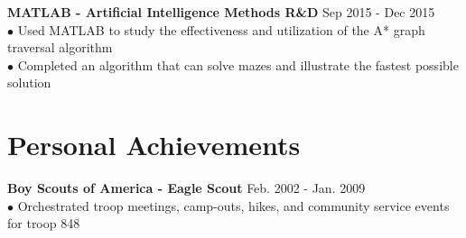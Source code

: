 \documentclass[margin,line]{res}
\begin{document}
\begin{resume}
{\bf MATLAB - Artificial Intelligence Methods R\&D}
\hfill{Sep 2015 - Dec 2015}\\
$\bullet$ Used MATLAB to study the effectiveness and utilization of the A* graph traversal algorithm \\
$\bullet$ Completed an algorithm that can solve mazes and illustrate the fastest possible solution

\section{\sc Personal Achievements}
{\bf Boy Scouts of America - Eagle Scout}
\hfill{Feb. 2002 - Jan. 2009}\\
$\bullet$ Orchestrated troop meetings, camp-outs, hikes, and community service events for troop 848


\end{resume}
\end{document}
